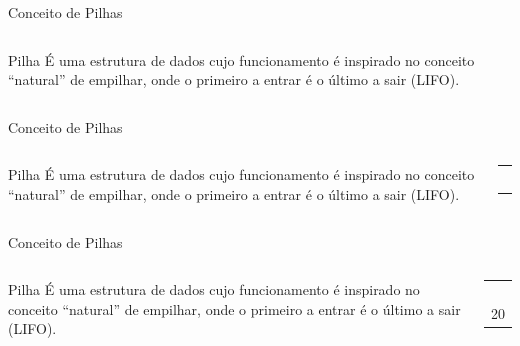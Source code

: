 \documentclass[12pt,table,xcolor={dvipsnames}]{beamer}
\begin{document}
\begin{frame}{Conceito de Pilhas}
\begin{columns}
\begin{block}{Pilha}
É uma estrutura de dados cujo funcionamento é inspirado no conceito “natural” de empilhar, onde o primeiro a entrar é o último a sair (LIFO).
\end{block}
\begin{center}
\end{center}
\end{columns}
\end{frame}

\begin{frame}{Conceito de Pilhas}
\begin{columns}
\begin{block}{Pilha}
É uma estrutura de dados cujo funcionamento é inspirado no conceito “natural” de empilhar, onde o primeiro a entrar é o último a sair (LIFO).
\end{block}
\begin{center}
{
\begin{tabular}{ |p{.5cm}| }
\hline
 \\ \hline
 \\ \hline
 \\ \hline
 \\ \hline
 \\ \hline
  \\ \hline
\end{tabular}
}
\end{center}
\end{columns}
\end{frame}

\begin{frame}{Conceito de Pilhas}
\begin{columns}
\begin{block}{Pilha}
É uma estrutura de dados cujo funcionamento é inspirado no conceito “natural” de empilhar, onde o primeiro a entrar é o último a sair (LIFO).
\end{block}
\begin{center}
{
\begin{tabular}{ |p{.5cm}| }
\hline
 \\ \hline
 \\ \hline
 \\ \hline
 \\ \hline
 \\ \hline
20  \\ \hline
\end{tabular}
}
\end{center}
\end{columns}
\end{frame}
\end{document}
